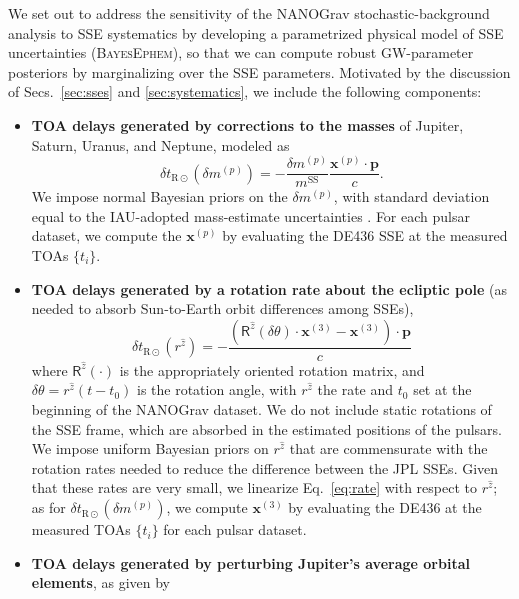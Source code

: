 \documentclass[iop,apj,twocolappendix]{emulateapj}
\begin{document}
We set out to address the sensitivity of the NANOGrav stochastic-background analysis to SSE systematics by developing a parametrized physical model of SSE uncertainties (\textsc{BayesEphem}), so that we can compute robust GW-parameter posteriors by marginalizing over the SSE parameters. 
Motivated by the discussion of Secs.\ \ref{sec:sses} and \ref{sec:systematics}, we include the following components:
%
\begin{itemize} %
%
\item \textbf{TOA delays generated by corrections to the masses} of Jupiter, Saturn, Uranus, and Neptune, modeled as \cite{2010ApJ...720L.201C}
%
\begin{equation}
\label{eq:massperturb}
    \delta t_{\mathrm{R}\odot}(\delta m^{(p)}) = -\frac{\delta m^{(p)}}{m^\mathrm{SS}} \frac{\mathbf{x}^{(p)} \cdot \mathbf{p}}{c}.
\end{equation}
%
We impose normal Bayesian priors on the $\delta m^{(p)}$, with standard deviation equal to the IAU-adopted mass-estimate uncertainties \citep{iaumasses}. For each pulsar dataset, we compute the $\mathbf{x}^{(p)}$ by evaluating the DE436 SSE at the measured TOAs $\{t_i\}$.
%
\item \textbf{TOA delays generated by a rotation rate about the ecliptic pole} (as needed to absorb Sun-to-Earth orbit differences among SSEs),
\begin{equation}
\label{eq:rate}
    \delta t_{\mathrm{R}\odot}(r^{\hat{z}}) =
    -\frac{(\mathsf{R}^{\hat{z}}(\delta \theta) \cdot \mathbf{x}^{(3)} - \mathbf{x}^{(3)}) \cdot \mathbf{p}}{c} 
\end{equation}
%
where $\mathsf{R}^{\hat{z}}(\cdot)$ is the appropriately oriented rotation matrix, and $\delta \theta = r^{\hat{z}} (t - t_0)$ is the rotation angle, with $r^{\hat{z}}$ the rate and $t_0$ set at the beginning of the NANOGrav dataset.
We do not include static rotations of the SSE frame, which are absorbed in the estimated positions of the pulsars.
We impose uniform Bayesian priors on $r^{\hat{z}}$ that are commensurate with the rotation rates needed to reduce the difference between the JPL SSEs. 
Given that these rates are very small, we linearize Eq.\ \eqref{eq:rate} with respect to $r^{\hat{z}}$; as for $\delta t_{\mathrm{R}\odot}(\delta m^{(p)})$, we compute $\mathbf{x}^{(3)}$ by evaluating the DE436 at the measured TOAs $\{t_i\}$ for each pulsar dataset.
%
\item \textbf{TOA delays generated by perturbing Jupiter's average orbital elements}, as given by

\end{itemize}
\end{document}
